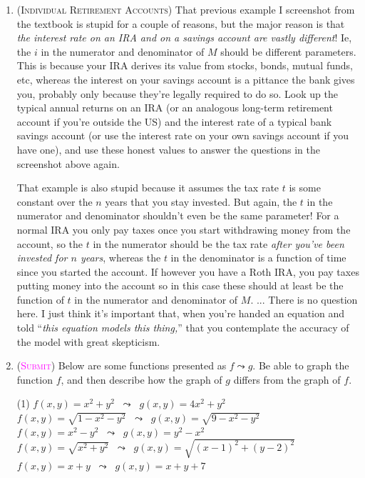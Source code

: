 \begin{enumerate}
    \item 
        (\textsc{Individual Retirement Accounts})
        That previous example I screenshot from the textbook 
        is stupid for a couple of reasons, but the major reason
        is that \emph{the interest rate on an IRA and on a savings account
        are vastly different}! Ie, the $i$ in the numerator and 
        denominator of $M$ should be different parameters.
        This is because your IRA derives its value from stocks,
        bonds, mutual funds, etc, whereas the interest 
        on your savings account is a pittance the bank gives you,
        probably only because they're legally required to do so.
        Look up the typical annual returns on an IRA 
        (or an analogous long-term retirement account if you're outside the US)
        and the interest rate of a typical bank savings account
        (or use the interest rate on your own savings account if you have one),
        and use these honest values 
        to answer the questions in the screenshot above again.

        That example is also stupid because it assumes the tax rate $t$ 
        is some constant over the $n$ years that you stay invested.
        But again, the $t$ in the numerator and denominator 
        shouldn't even be the same parameter!
        For a normal IRA you only pay taxes once you start withdrawing money
        from the account, so the $t$ in the numerator should be the tax rate
        \emph{after you've been invested for $n$ years},
        whereas the $t$ in the denominator is a function of time
        since you started the account. 
        If however you have a Roth IRA,
        you pay taxes putting money into the account
        so in this case these should at least be the function of $t$
        in the numerator and denominator of $M$.
        ... There is no question here. I just think it's important 
        that, when you're handed an equation and told ``\emph{this 
        equation models this thing,}'' that you contemplate 
        the accuracy of the model with great skepticism.
        
    \item 
        (\textsc{\textcolor{magenta}{Submit}})
        Below are some functions presented as $f \leadsto g$. 
        Be able to graph the function $f$, 
        and then describe how the graph of $g$ differs from the graph of $f$.
        \begin{tasks}[after-item-skip=2ex](1)
            \task $f(x,y) = x^2+y^2 \;\;\leadsto\;\; g(x,y) = 4x^2+y^2 $
            \task $f(x,y) = \sqrt{1-x^2-y^2} \;\;\leadsto\;\; g(x,y) = \sqrt{9-x^2-y^2} $
            \task $f(x,y) = x^2-y^2 \;\;\leadsto\;\; g(x,y) = y^2-x^2 $
            \task $f(x,y) = \sqrt{x^2+y^2} \;\;\leadsto\;\; g(x,y) = \sqrt{(x-1)^2+(y-2)^2} $
            \task $f(x,y) = x+y \;\;\leadsto\;\; g(x,y) = x+y +7$
        \end{tasks}


\end{enumerate}
